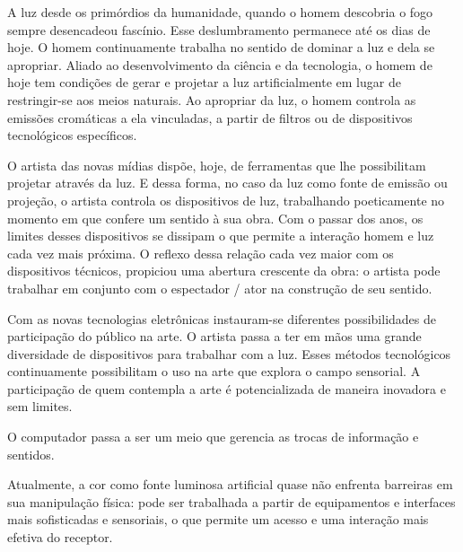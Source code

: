 A luz desde os primórdios da humanidade, quando o homem descobria o fogo sempre desencadeou fascínio. Esse deslumbramento permanece até os dias de hoje. O homem continuamente trabalha no sentido de dominar a luz e dela se apropriar. Aliado ao desenvolvimento da ciência e da tecnologia, o homem de hoje tem condições de gerar e projetar a luz artificialmente em lugar de restringir-se aos meios naturais. Ao apropriar da luz, o homem controla as emissões cromáticas a ela vinculadas, a partir de filtros ou de dispositivos tecnológicos específicos. \cite[p.73]{henno}

O artista das novas mídias dispõe, hoje, de ferramentas que lhe possibilitam projetar através da luz. E dessa forma, no caso da luz como fonte de emissão ou projeção, o artista controla os dispositivos de luz, trabalhando poeticamente no momento em que confere um sentido à sua obra. Com o passar dos anos, os limites desses dispositivos se dissipam o que permite a interação homem e luz cada vez mais próxima. O reflexo dessa relação cada vez maior com os dispositivos técnicos, propiciou uma abertura crescente da obra: o artista pode trabalhar em conjunto com o espectador / ator na construção de seu sentido. \cite[p.73]{henno}

Com as novas tecnologias eletrônicas instauram-se diferentes possibilidades de participação do público na arte. O artista passa a ter em mãos uma grande diversidade de dispositivos para trabalhar com a luz. Esses métodos tecnológicos continuamente possibilitam o uso na arte que explora o campo sensorial. A participação de quem contempla a arte é potencializada de maneira inovadora e sem limites.  \cite[p.86]{henno}

O computador passa a ser um meio que gerencia as trocas de informação e sentidos. \cite[p.112]{henno}

Atualmente, a cor como fonte luminosa artificial quase não enfrenta barreiras em sua manipulação física: pode ser trabalhada a partir de equipamentos e interfaces mais sofisticadas e sensoriais, o que permite um acesso e uma interação mais efetiva do receptor. \cite[p.112]{henno}

